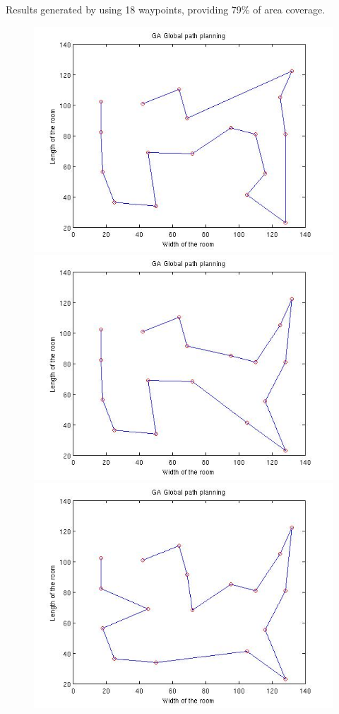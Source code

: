 Results generated by using 18 waypoints, providing 79\% of area coverage.
\begin{figure}[h]
  \includegraphics[width=\linewidth]{figures/18pts_GA_linear_2D.jpg}  
  \endminipage \hfill
  \includegraphics[width=\linewidth]{figures/18pts_GA_linear_2D_2.jpg}  
  \endminipage \hfill
  \includegraphics[width=\linewidth]{figures/18pts_GA_linear_2D_3.jpg}  

\end{figure}
